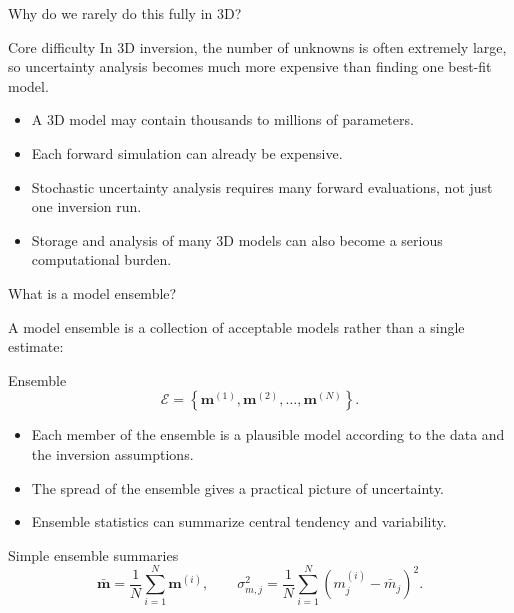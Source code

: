 \documentclass[aspectratio=169]{beamer}
\renewcommand{\vec}[1]{\mathbf{#1}}
\newcommand{\mm}{ {\vec{m}} }
\begin{document}
\begin{frame}{Why do we rarely do this fully in 3D?}
\small

\begin{alertblock}{Core difficulty}
In 3D inversion, the number of unknowns is often extremely large, so uncertainty analysis becomes much more expensive than finding one best-fit model.
\end{alertblock}

\begin{itemize}
    \item[--] A 3D model may contain thousands to millions of parameters.
    \item[--] Each forward simulation can already be expensive.
    \item[--] Stochastic uncertainty analysis requires many forward evaluations, not just one inversion run.
    \item[--] Storage and analysis of many 3D models can also become a serious computational burden.
\end{itemize}
\end{frame}

\begin{frame}{What is a model ensemble?}
\small

A \alert{model ensemble} is a collection of acceptable models rather than a single estimate:
\begin{alertblock}{Ensemble}
\[
\mathcal{E} = \left\{ \mm^{(1)},\mm^{(2)},\dots,\mm^{(N)} \right\}.
\]
\end{alertblock}

\begin{itemize}
    \item[--] Each member of the ensemble is a plausible model according to the data and the inversion assumptions.
    \item[--] The spread of the ensemble gives a practical picture of uncertainty.
    \item[--] Ensemble statistics can summarize central tendency and variability.
\end{itemize}

\begin{block}{Simple ensemble summaries}
\[
\bar{\mm} = \frac{1}{N}\sum_{i=1}^{N} \mm^{(i)},
\qquad
\sigma_{m,j}^2 = \frac{1}{N}\sum_{i=1}^{N}\left(m_j^{(i)}-\bar{m}_j\right)^2.
\]
\end{block}
\end{frame}
\end{document}
